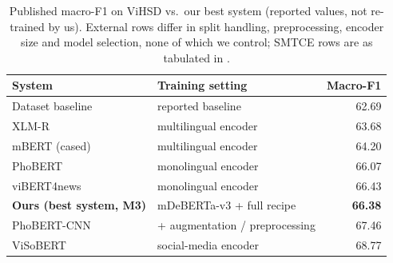 \begin{table}[t]
\centering
\small
\setlength{\tabcolsep}{4pt}
\caption{Published macro-F1 on ViHSD vs.\ our best system (reported values, not
re-trained by us).  External rows differ in split handling, preprocessing, encoder
size and model selection, none of which we control; SMTCE rows are as tabulated in
\cite{nguyen2022smtce}.}
\label{tab:external}
\begin{tabular}{llr}
\toprule
System & Training setting & Macro-F1 \\
\midrule
Dataset baseline \cite{luu2021vihsd} & reported baseline & 62.69 \\
XLM-R \cite{nguyen2022smtce,conneau2020xlmr} & multilingual encoder & 63.68 \\
mBERT (cased) \cite{nguyen2022smtce} & multilingual encoder & 64.20 \\
PhoBERT \cite{nguyen2022smtce,nguyen2020phobert} & monolingual encoder & 66.07 \\
viBERT4news \cite{nguyen2022smtce} & monolingual encoder & 66.43 \\
\midrule
\textbf{Ours (best system, M3)} & mDeBERTa-v3 + full recipe & \textbf{66.38} \\
PhoBERT-CNN \cite{tran2022phobertcnn} & + augmentation / preprocessing & 67.46 \\
ViSoBERT \cite{nguyen2023visobert} & social-media encoder & 68.77 \\
\bottomrule
\end{tabular}
\end{table}
